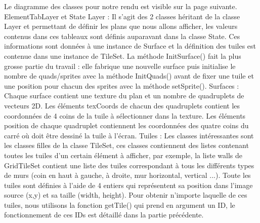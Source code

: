 \documentclass[a4paper,12pt]{article}
\begin{document}
Le diagramme des classes pour notre rendu est visible sur la page suivante.
\bigbreak
ElementTabLayer et State Layer : Il s'agit des 2 classes héritant de la classe Layer et permettant de définir les plans que nous allons afficher, les valeurs contenus dans ces tableaux sont définis auparavant dans la classe State.
Ces informations sont données à une instance de Surface et la définition des tuiles est contenue dans une instance de TileSet.
La méthode InitSurface() fait la plus grosse partie du travail : elle fabrique une nouvelle surface puis initialise le nombre de quads/sprites avec la méthode InitQuads() avant de fixer une tuile et une position pour chacun des sprites avec la méthode setSprite().
\bigbreak
Surfaces : Chaque surface contient une texture du plan et un nombre de quadruplets de vecteurs 2D. Les éléments texCoords de chacun des quadruplets contient les coordonnées de 4 coins de la tuile à sélectionner dans la texture. Les éléments position de chaque quadruplet contiennent les coordonnées des quatre coins du carré où doit être dessiné la tuile à l'écran.
\bigbreak
Tuiles : Les classes intéressantes sont les classes filles de la classe TileSet, ces classes contiennent des listes contenant toutes les tuiles d'un certain élément à afficher, par exemple, la liste walls de GridTileSet contient une liste des tuiles correspondant à tous les différents types de murs (coin en haut à gauche, à droite, mur horizontal, vertical ...).
Toute les tuiles sont définies à l'aide de 4 entiers qui représentent sa position dans l'image source (x,y) et sa taille (width, height).
Pour obtenir n'importe laquelle de ces tuiles, nous utilisons la fonction getTile() qui prend en argument un ID, le fonctionnement de ces IDs est détaillé dans la partie précédente. 
\end{document}
